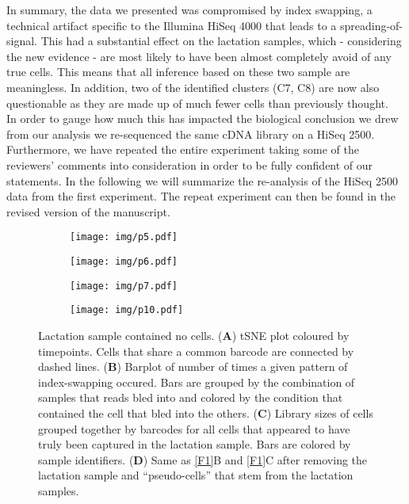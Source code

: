 \documentclass{article}
\begin{document}
In summary, the data we presented was compromised by index swapping, a technical artifact specific to the Illumina HiSeq 4000 that leads to a spreading-of-signal.
This had a substantial effect on the lactation samples, which - considering the new evidence - are most likely to have been almost completely avoid of any true cells.
This means that all inference based on these two sample are meaningless. 
In addition, two of the identified clusters (C7, C8) are now also questionable as they are made up of much fewer cells than previously thought.\\
In order to gauge how much this has impacted the biological conclusion we drew from our analysis we re-sequenced the same cDNA library on a HiSeq 2500.
Furthermore, we have repeated the entire experiment taking some of the reviewers' comments into consideration in order to be fully confident of our statements.
In the following we will summarize the re-analysis of the HiSeq 2500 data from the first experiment.
The repeat experiment can then be found in the revised version of the manuscript.


\begin{figure}
    \begin{subfigure}[c]{0.5\textwidth}
	\texttt{[image: img/p5.pdf]}
    \caption{}
    \end{subfigure}
    \begin{subfigure}[c]{0.5\textwidth}
	\texttt{[image: img/p6.pdf]}
    \caption{}
    \end{subfigure}
    \begin{subfigure}[c]{0.5\textwidth}
	\texttt{[image: img/p7.pdf]}
    \caption{}
    \end{subfigure}
    \begin{subfigure}[c]{0.5\textwidth}
	\texttt{[image: img/p10.pdf]}
    \caption{}
    \end{subfigure}
    \caption{Lactation sample contained no cells.
	(\textbf{A}) tSNE plot coloured by timepoints.
	Cells that share a common barcode are connected by dashed lines.
	(\textbf{B}) Barplot of number of times a given pattern of index-swapping occured.
	Bars are grouped by the combination of samples that reads bled into and colored by the condition that contained the cell that bled into the others.
	(\textbf{C}) Library sizes of cells grouped together by barcodes for all cells that appeared to have truly been captured in the lactation sample.
	Bars are colored by sample identifiers.
	(\textbf{D}) Same as \autoref{F1}B and \autoref{F1}C after removing the lactation sample and ``pseudo-cells'' that stem from the lactation samples.
    }
    \label{F3}
\end{figure}
\end{document}

